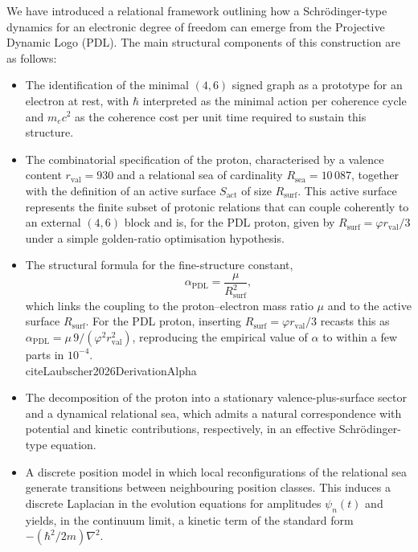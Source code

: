 \documentclass[11pt,a4paper]{article}
\begin{document}
We have introduced a relational framework outlining how a Schr\"odinger-type dynamics for an electronic degree of freedom can emerge from the Projective Dynamic Logo (PDL). The main structural components of this construction are as follows:
\begin{itemize}
\item The identification of the minimal $(4,6)$ signed graph as a prototype for an electron at rest, with $\hbar$ interpreted as the minimal action per coherence cycle and $m_e c^{2}$ as the coherence cost per unit time required to sustain this structure.\cite{Laubscher2026IntroPDL,Laubscher2026PDL_English}
\item The combinatorial specification of the proton, characterised by a valence content $r_{\mathrm{val}}=930$ and a relational sea of cardinality $R_{\mathrm{sea}}=10\,087$, together with the definition of an active surface $S_{\mathrm{act}}$ of size $R_{\mathrm{surf}}$. This active surface represents the finite subset of protonic relations that can couple coherently to an external $(4,6)$ block and is, for the PDL proton, given by $R_{\mathrm{surf}} = \varphi r_{\mathrm{val}}/3$ under a simple golden-ratio optimisation hypothesis.\cite{Laubscher2026PDL_English,Laubscher2026LDP_French,Laubscher2026DerivationAlpha}
\item The structural formula for the fine-structure constant,
\begin{equation}
\alpha_{\mathrm{PDL}} = \frac{\mu}{R_{\mathrm{surf}}^{2}},
\end{equation}
which links the coupling to the proton–electron mass ratio $\mu$ and to the active surface $R_{\mathrm{surf}}$. For the PDL proton, inserting $R_{\mathrm{surf}} = \varphi r_{\mathrm{val}}/3$ recasts this as $\alpha_{\mathrm{PDL}} = \mu\,9/(\varphi^{2} r_{\mathrm{val}}^{2})$, reproducing the empirical value of $\alpha$ to within a few parts in $10^{-4}$.\\cite{Laubscher2026DerivationAlpha}
\item The decomposition of the proton into a stationary valence-plus-surface sector and a dynamical relational sea, which admits a natural correspondence with potential and kinetic contributions, respectively, in an effective Schr\"odinger-type equation.
\item A discrete position model in which local reconfigurations of the relational sea generate transitions between neighbouring position classes. This induces a discrete Laplacian in the evolution equations for amplitudes $\psi_n(t)$ and yields, in the continuum limit, a kinetic term of the standard form $-(\hbar^{2}/2m)\nabla^{2}$.

\end{itemize}
\end{document}

